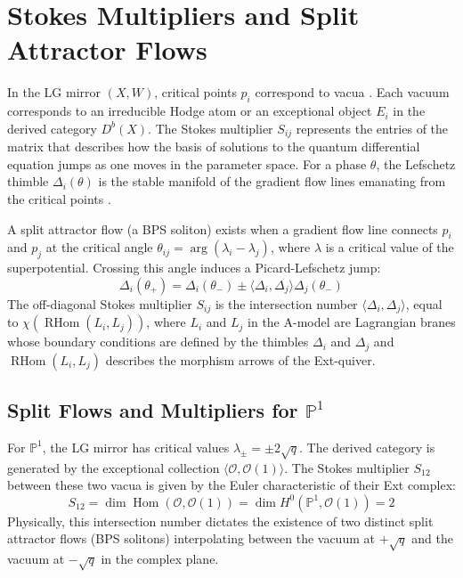 \documentclass[12pt,reqno]{amsart}
\theoremstyle{remark} \newtheorem{remark}[theorem]{Remark}
\begin{document}
\section{Stokes Multipliers and Split Attractor Flows}
In the LG mirror $(X, W)$, critical
points $p_i$ correspond to vacua \cite{Denef2000, Denef2008}.  Each vacuum corresponds to an
irreducible Hodge atom or an exceptional object $E_i$ in the derived
category $D^b(X)$.  The Stokes multiplier $S_{ij}$ represents the
entries of the matrix that describes how the basis of solutions to the
quantum differential equation jumps as one moves in the parameter
space.  For a phase $\theta$, the Lefschetz thimble $\Delta_i(\theta)$
is the stable manifold of the gradient flow lines emanating from the
critical points \cite{Seidel2008}.

A split attractor flow (a BPS soliton) exists when a gradient flow
line connects $p_i$ and $p_j$ at the critical angle $\theta_{ij} =
\arg(\lambda_i - \lambda_j)$, where $\lambda$ is a critical value of
the superpotential.  Crossing this angle induces a Picard-Lefschetz
jump:
\begin{equation}
    \Delta_i(\theta_+) = \Delta_i(\theta_-) \pm \langle \Delta_i,
    \Delta_j \rangle \Delta_j(\theta_-)
\end{equation}
The off-diagonal Stokes multiplier $S_{ij}$ is the
intersection number $\langle \Delta_i, \Delta_j \rangle$, equal to
$\chi(\operatorname{RHom}(L_i, L_j))$, where $L_i$ and $L_j$ in the
A-model are Lagrangian branes whose boundary conditions are defined by
the thimbles $\Delta_i$ and $\Delta_j$ and
$\operatorname{RHom}(L_i, L_j)$ describes the morphism arrows of the
Ext-quiver.

\subsection{Split Flows and Multipliers for $\mathbb{P}^1$}
For $\mathbb{P}^1$, the LG mirror has critical values $\lambda_\pm =
\pm 2\sqrt{q}$. The derived category is generated by the exceptional
collection $\langle \mathcal{O}, \mathcal{O}(1) \rangle$. The Stokes
multiplier $S_{12}$ between these two vacua is given by the Euler
characteristic of their Ext complex:
\begin{equation}
    S_{12} = \dim \operatorname{Hom}(\mathcal{O}, \mathcal{O}(1)) =
    \dim H^0(\mathbb{P}^1, \mathcal{O}(1)) = 2
\end{equation}
Physically, this intersection number dictates the existence of
two distinct split attractor flows (BPS solitons) interpolating between
the vacuum at $+\sqrt{q}$ and the vacuum at $-\sqrt{q}$ in the complex
plane.
\end{document}
